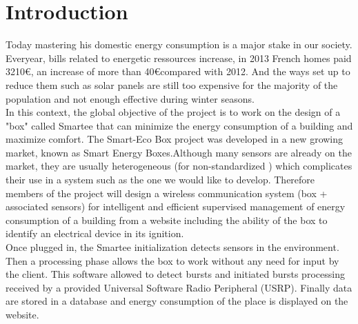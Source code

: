 %
%
\section{Introduction}

Today mastering his domestic energy consumption is a major stake in our society. Everyear, bills related to energetic ressources increase, in 2013 French homes paid 3210\euro, an increase of more than 40\euro compared with 2012. And the ways set up to reduce them such as solar panels are still too expensive for the majority of the population and not enough effective during winter seasons.\\

In this context, the global objective of the project is to work on the design of a "box" called Smartee that can minimize the energy consumption of a building and maximize comfort. The Smart-Eco Box project was developed in a new growing market, known as Smart Energy Boxes.Although many sensors are already on the market, they are usually heterogeneous (for non-standardized ) which complicates their use in a system such as the one we would like to develop. Therefore members of the project will design a wireless communication system (box + associated sensors) for intelligent and efficient supervised management of energy consumption of a building from a website including the ability of the box to identify an electrical device in its ignition.\\

Once plugged in, the Smartee initialization detects sensors in the environment. Then a processing phase allows the box to work without any need for input by the client. This software allowed to detect bursts and initiated bursts processing received by a provided Universal Software Radio Peripheral (USRP). Finally data are stored in a database and energy consumption of the place is displayed on the website. 

